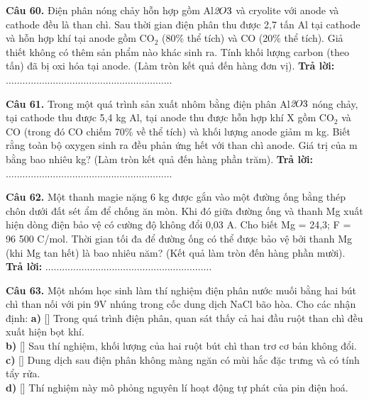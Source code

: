 \documentclass{article}
\begin{document}
\fontsize{24}{32}\selectfont
\textbf{Câu 60.} Điện phân nóng chảy hỗn hợp gồm Al$\textit{{\text{2}}$O$}{\text{3}}$ và cryolite với anode và cathode đều là than chì. Sau thời gian điện phân thu được 2,7 tấn Al tại cathode và hỗn hợp khí tại anode gồm CO$_{\text{2}}$ (80\% thể tích) và CO (20\% thể tích). Giả thiết không có thêm sản phẩm nào khác sinh ra. Tính khối lượng carbon (theo tấn) đã bị oxi hóa tại anode. (Làm tròn kết quả đến hàng đơn vị).
\vspace{12pt}
\textbf{Trả lời:} $\dots\dots\dots\dots\dots\dots\dots\dots\dots\dots\dots\dots\dots\dots\dots\dots\dots\dots\dots\dots$
\vspace*{\fill}
\newpage

\fontsize{24}{32}\selectfont
\textbf{Câu 61.} Trong một quá trình sản xuất nhôm bằng điện phân Al$\textit{{\text{2}}$O$}{\text{3}}$ nóng chảy, tại cathode thu được 5,4 kg Al, tại anode thu được hỗn hợp khí X gồm CO$_{\text{2}}$ và CO (trong đó CO chiếm 70\% về thể tích) và khối lượng anode giảm m kg. Biết rằng toàn bộ oxygen sinh ra đều phản ứng hết với than chì anode. Giá trị của m bằng bao nhiêu kg? (Làm tròn kết quả đến hàng phần trăm).
\vspace{12pt}
\textbf{Trả lời:} $\dots\dots\dots\dots\dots\dots\dots\dots\dots\dots\dots\dots\dots\dots\dots\dots\dots\dots\dots\dots$
\vspace*{\fill}
\newpage

\fontsize{24}{32}\selectfont
\textbf{Câu 62.} Một thanh magie nặng 6 kg được gắn vào một đường ống bằng thép chôn dưới đất sét ẩm để chống ăn mòn. Khi đó giữa đường ống và thanh Mg xuất hiện dòng điện bảo vệ có cường độ không đổi 0,03 A. Cho biết Mg = 24,3; F = 96 500 C/mol. Thời gian tối đa để đường ống có thể được bảo vệ bởi thanh Mg (khi Mg tan hết) là bao nhiêu năm? (Kết quả làm tròn đến hàng phần mười).
\vspace{12pt}
\textbf{Trả lời:} $\dots\dots\dots\dots\dots\dots\dots\dots\dots\dots\dots\dots\dots\dots\dots\dots\dots\dots\dots\dots$
\vspace*{\fill}
\newpage

\fontsize{22}{29}\selectfont
\textbf{Câu 63.} Một nhóm học sinh làm thí nghiệm điện phân nước muối bằng hai bút chì than nối với pin 9V nhúng trong cốc dung dịch NaCl bão hòa. Cho các nhận định:
\vspace{6pt}
\textbf{a)} [\quad] Trong quá trình điện phân, quan sát thấy cả hai đầu ruột than chì đều xuất hiện bọt khí.\\[4pt]
\textbf{b)} [\quad] Sau thí nghiệm, khối lượng của hai ruột bút chì than trơ cơ bản không đổi.\\[4pt]
\textbf{c)} [\quad] Dung dịch sau điện phân không màng ngăn có mùi hắc đặc trưng và có tính tẩy rửa.\\[4pt]
\textbf{d)} [\quad] Thí nghiệm này mô phỏng nguyên lí hoạt động tự phát của pin điện hoá.\\[4pt]
\vspace*{\fill}
\newpage
\end{document}
